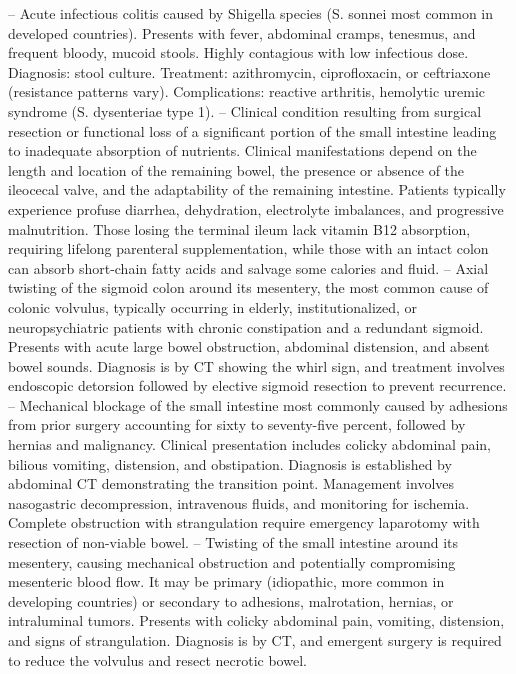 -- Acute infectious colitis caused by Shigella species (S. sonnei most common in developed countries). Presents with fever, abdominal cramps, tenesmus, and frequent bloody, mucoid stools. Highly contagious with low infectious dose. Diagnosis: stool culture. Treatment: azithromycin, ciprofloxacin, or ceftriaxone (resistance patterns vary). Complications: reactive arthritis, hemolytic uremic syndrome (S. dysenteriae type 1).
-- Clinical condition resulting from surgical resection or functional loss of a significant portion of the small intestine leading to inadequate absorption of nutrients. Clinical manifestations depend on the length and location of the remaining bowel, the presence or absence of the ileocecal valve, and the adaptability of the remaining intestine. Patients typically experience profuse diarrhea, dehydration, electrolyte imbalances, and progressive malnutrition. Those losing the terminal ileum lack vitamin B12 absorption, requiring lifelong parenteral supplementation, while those with an intact colon can absorb short-chain fatty acids and salvage some calories and fluid.
-- Axial twisting of the sigmoid colon around its mesentery, the most common cause of colonic volvulus, typically occurring in elderly, institutionalized, or neuropsychiatric patients with chronic constipation and a redundant sigmoid. Presents with acute large bowel obstruction, abdominal distension, and absent bowel sounds. Diagnosis is by CT showing the whirl sign, and treatment involves endoscopic detorsion followed by elective sigmoid resection to prevent recurrence.
-- Mechanical blockage of the small intestine most commonly caused by adhesions from prior surgery accounting for sixty to seventy-five percent, followed by hernias and malignancy. Clinical presentation includes colicky abdominal pain, bilious vomiting, distension, and obstipation. Diagnosis is established by abdominal CT demonstrating the transition point. Management involves nasogastric decompression, intravenous fluids, and monitoring for ischemia. Complete obstruction with strangulation require emergency laparotomy with resection of non-viable bowel.
-- Twisting of the small intestine around its mesentery, causing mechanical obstruction and potentially compromising mesenteric blood flow. It may be primary (idiopathic, more common in developing countries) or secondary to adhesions, malrotation, hernias, or intraluminal tumors. Presents with colicky abdominal pain, vomiting, distension, and signs of strangulation. Diagnosis is by CT, and emergent surgery is required to reduce the volvulus and resect necrotic bowel.
